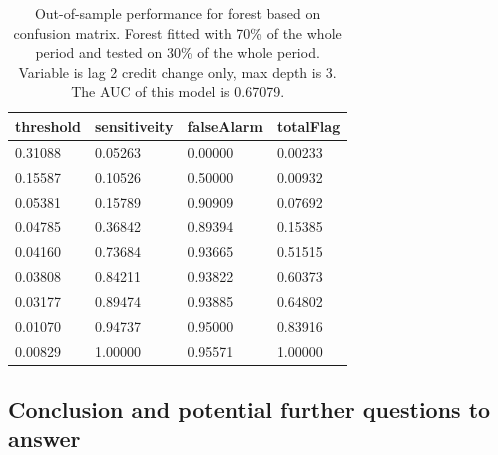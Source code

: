 \documentclass{article}
\begin{document}
\begin{multicols}{2}
\begin{table}[H]
        \caption{Out-of-sample performance for forest based on confusion matrix. Forest fitted with 70\% of the whole period and tested on
        30\% of the whole period. Variable is lag 2 credit change only,
        max depth is 3. The AUC of this model is 0.67079.}

    \begin{center}\begin{tabular}{|l|l|l|l|}
    \hline
     threshold           & sensitiveity        & falseAlarm         & totalFlag            \\ \hline
    0.31088  & 0.05263 & 0.00000                & 0.00233 \\ \hline
    0.15587  & 0.10526 & 0.50000                & 0.00932 \\ \hline
    0.05381   & 0.15789 & 0.90909 & 0.07692  \\ \hline
    0.04785 & 0.36842  & 0.89394 & 0.15385  \\ \hline
    0.04160  & 0.73684  & 0.93665 & 0.51515   \\ \hline
    0.03808  & 0.84211  & 0.93822 & 0.60373   \\ \hline
    0.03177  & 0.89474  & 0.93885 & 0.64802   \\ \hline
    0.01070 & 0.94737  & 0.95000               & 0.83916   \\ \hline
    0.00829  & 1.00000                 & 0.95571 & 1.00000                  \\ \hline
    \end{tabular}\end{center}
\end{table}
\end{multicols}

\subsection*{Conclusion and potential further questions to answer}
\end{document}
